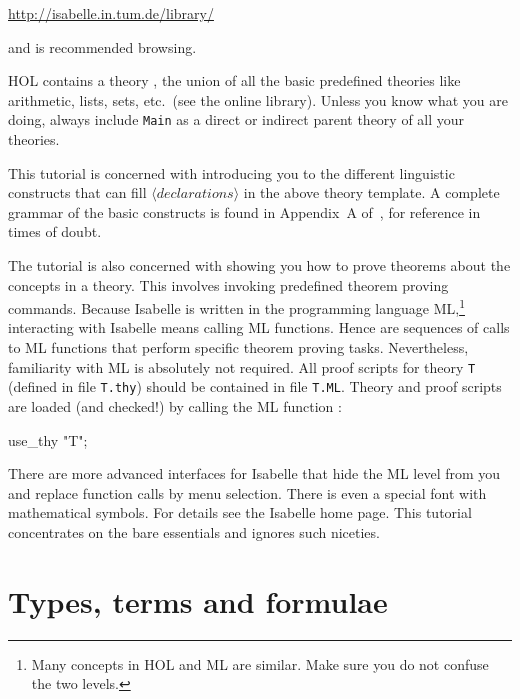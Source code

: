 \begin{center}\small
    \url{http://isabelle.in.tum.de/library/}
\end{center}

and is recommended browsing.
\begin{warn}
  HOL contains a theory , the union of all the basic
  predefined theories like arithmetic, lists, sets, etc.\ (see the online
  library).  Unless you know what you are doing, always include \texttt{Main}
  as a direct or indirect parent theory of all your theories.
\end{warn}

This tutorial is concerned with introducing you to the different linguistic
constructs that can fill ${\langle}declarations{\rangle}$ in the above theory template.
A complete grammar of the basic constructs is found in Appendix~A
of~\cite{isabelle-ref}, for reference in times of doubt.

The tutorial is also concerned with showing you how to prove theorems about
the concepts in a theory. This involves invoking predefined theorem proving
commands. Because Isabelle is written in the programming language
ML,\footnote{Many concepts in HOL and ML are similar. Make sure you do not
  confuse the two levels.} interacting with Isabelle means calling ML
functions. Hence  are sequences of calls to ML
functions that perform specific theorem proving tasks. Nevertheless,
familiarity with ML is absolutely not required.  All proof scripts for theory
\texttt{T} (defined in file \texttt{T.thy}) should be contained in file
\texttt{T.ML}. Theory and proof scripts are loaded (and checked!) by calling
the ML function :
\begin{ttbox}
use_thy "T";
\end{ttbox}

There are more advanced interfaces for Isabelle that hide the ML level from
you and replace function calls by menu selection. There is even a special
font with mathematical symbols. For details see the Isabelle home page.  This
tutorial concentrates on the bare essentials and ignores such niceties.

\section{Types, terms and formulae}
\label{sec:TypesTermsForms}

